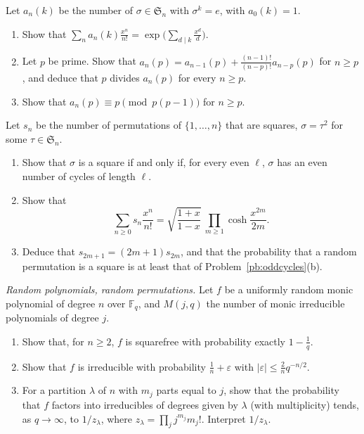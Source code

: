 \begin{exercise}[$\star\star$]\label{pb:roots}
Let $a_n(k)$ be the number of $\sigma\in\mathfrak S_n$ with $\sigma^k=e$, with $a_0(k)=1$.
\begin{enumerate}[label=(\alph*)]
\item Show that $\sum_na_n(k)\frac{x^n}{n!}=\exp\bigl(\sum_{d\mid k}\frac{x^d}d\bigr)$.
\item Let $p$ be prime. Show that $a_n(p)=a_{n-1}(p)+\frac{(n-1)!}{(n-p)!}a_{n-p}(p)$ for $n\ge p$, and deduce that $p$ divides
$a_n(p)$ for every $n\ge p$.
\item Show that $a_n(p)\equiv p\pmod{p(p-1)}$ for $n\ge p$.
\end{enumerate}
\end{exercise}

\begin{exercise}[$\star\star\star$]\label{pb:squares}
Let $s_n$ be the number of permutations of $\{1,\dots,n\}$ that are squares, $\sigma=\tau^2$ for some $\tau\in\mathfrak S_n$.
\begin{enumerate}[label=(\alph*)]
\item Show that $\sigma$ is a square if and only if, for every even $\ell$, $\sigma$ has an even number of cycles of length $\ell$.
\item Show that
\[
\sum_{n\ge0}s_n\frac{x^n}{n!}=\sqrt{\frac{1+x}{1-x}}\ \prod_{m\ge1}\cosh\frac{x^{2m}}{2m}.
\]
\item Deduce that $s_{2m+1}=(2m+1)s_{2m}$, and that the probability that a random permutation is a square is at least that of
Problem~\ref{pb:oddcycles}(b).
\end{enumerate}
\end{exercise}

\begin{exercise}[$\star\star$]\label{pb:randpoly}
\emph{Random polynomials, random permutations.} Let $f$ be a uniformly random monic polynomial of degree $n$ over $\mathbb F_q$,
and $M(j,q)$ the number of monic irreducible polynomials of degree $j$.
\begin{enumerate}[label=(\alph*)]
\item Show that, for $n\ge2$, $f$ is squarefree with probability exactly $1-\frac1q$.
\item Show that $f$ is irreducible with probability $\frac1n+\varepsilon$ with $|\varepsilon|\le\frac2n q^{-n/2}$.
\item For a partition $\lambda$ of $n$ with $m_j$ parts equal to $j$, show that the probability that $f$ factors into irreducibles of
degrees given by $\lambda$ (with multiplicity) tends, as $q\to\infty$, to $1/z_\lambda$, where $z_\lambda=\prod_jj^{m_j}m_j!$.
Interpret $1/z_\lambda$.
\end{enumerate}
\end{exercise}

